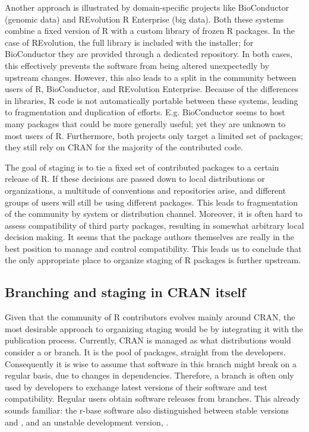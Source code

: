Another approach is illustrated by domain-specific projects like BioConductor
(genomic data) and REvolution R Enterprise (big data). Both these systems
combine a fixed version of R with a custom library of frozen R packages. In
the case of REvolution, the full library is included with the installer; for
BioConductor they are provided through a dedicated repository. In both cases,
this effectively prevents the software from being altered unexpectedly by
upstream changes. However, this also leads to a split in the community between
users of R, BioConductor, and REvolution Enterprise. Because of the differences
in libraries, R code is not automatically portable between these systems,
leading to fragmentation and duplication of efforts. E.g. BioConductor seems to
host many packages that could be more generally useful; yet they are unknown to
most users of R. Furthermore, both projects only target a limited set of
packages; they still rely on CRAN for the majority of the contributed code.

The goal of staging is to tie a fixed set of contributed packages to a certain
release of R. If these decisions are passed down to local distributions or
organizations, a multitude of conventions and repositories arise, and different
groups of users will still be using different packages. This leads to
fragmentation of the community by system or distribution channel. Moreover, it
is often hard to assess compatibility of third party packages, resulting in
somewhat arbitrary local decision making. It seems that the package authors
themselves are really in the best position to manage and control compatibility.
This leads us to conclude that the only appropriate place to organize staging
of R packages is further upstream.

\subsection{Branching and staging in CRAN itself}

Given that the community of R contributors evolves mainly around CRAN, the most
desirable approach to organizing staging would be by integrating it with the
publication process. Currently, CRAN is managed as what distributions would
consider a  or  branch. It is the pool of
 packages, straight from the developers. Consequently it is
wise to assume that software in this branch might break on a regular basis, due
to changes in dependencies. Therefore, a  branch is often only
used by developers to exchange latest versions of their software and test
compatibility. Regular users obtain software releases from 
branches. This already sounds familiar: the r-base software also distinguished
between stable versions  and , and an
unstable development version, .


